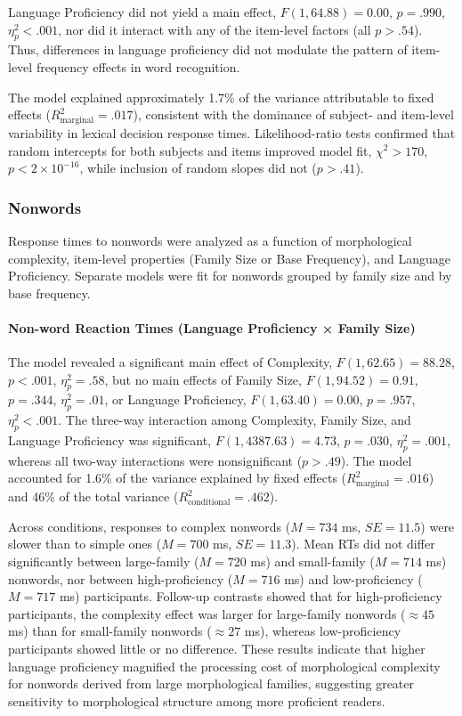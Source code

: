 	Language Proficiency did not yield a main effect, $F(1, 64.88) = 0.00$, $p = .990$, $\eta_p^2 < .001$, nor did it interact with any of the item-level factors (all $p > .54$). Thus, differences in language proficiency did not modulate the pattern of item-level frequency effects in word recognition. 
	
	The model explained approximately 1.7\% of the variance attributable to fixed effects ($R^2_{\text{marginal}} = .017$), consistent with the dominance of subject- and item-level variability in lexical decision response times. Likelihood-ratio tests confirmed that random intercepts for both subjects and items improved model fit, $\chi^2 > 170$, $p < 2 \times 10^{-16}$, while inclusion of random slopes did not ($p > .41$).
	
	\subsubsection{Nonwords}
	
	Response times to nonwords were analyzed as a function of morphological complexity, item-level properties (Family Size or Base Frequency), and Language Proficiency. Separate models were fit for nonwords grouped by family size and by base frequency.
	
	\paragraph{Non-word Reaction Times (Language Proficiency × Family Size)}
	
	The model revealed a significant main effect of Complexity, $F(1, 62.65) = 88.28$, $p < .001$, $\eta_p^2 = .58$, but no main effects of Family Size, $F(1, 94.52) = 0.91$, $p = .344$, $\eta_p^2 = .01$, or Language Proficiency, $F(1, 63.40) = 0.00$, $p = .957$, $\eta_p^2 < .001$. The three-way interaction among Complexity, Family Size, and Language Proficiency was significant, $F(1, 4387.63) = 4.73$, $p = .030$, $\eta_p^2 = .001$, whereas all two-way interactions were nonsignificant ($p > .49$). The model accounted for 1.6\% of the variance explained by fixed effects ($R^2_{\text{marginal}} = .016$) and 46\% of the total variance ($R^2_{\text{conditional}} = .462$). 
	
	Across conditions, responses to complex nonwords ($M = 734$ ms, $SE = 11.5$) were slower than to simple ones ($M = 700$ ms, $SE = 11.3$). Mean RTs did not differ significantly between large-family ($M = 720$ ms) and small-family ($M = 714$ ms) nonwords, nor between high-proficiency ($M = 716$ ms) and low-proficiency ($M = 717$ ms) participants. Follow-up contrasts showed that for high-proficiency participants, the complexity effect was larger for large-family nonwords ($\approx 45$ ms) than for small-family nonwords ($\approx 27$ ms), whereas low-proficiency participants showed little or no difference. These results indicate that higher language proficiency magnified the processing cost of morphological complexity for nonwords derived from large morphological families, suggesting greater sensitivity to morphological structure among more proficient readers.
	
